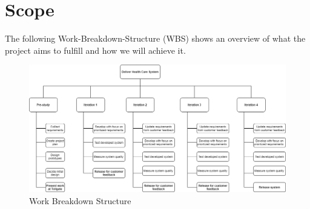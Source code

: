 \section{Scope}

\label{sec:scope}

The following Work-Breakdown-Structure (WBS) shows an overview of what the project aims to fulfill and how we will achieve it.
\begin{figure}[ht]
    \centering\includegraphics[width=1 \linewidth]{figures/wbs_tddc88.png}
    \caption{Work Breakdown Structure}
    \label{fig:example1}
\end{figure}


